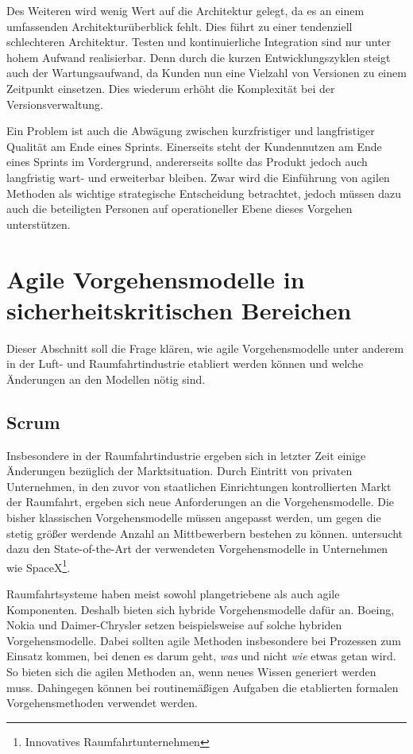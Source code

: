 Des Weiteren wird wenig Wert auf die Architektur gelegt, da es an einem umfassenden Architekturüberblick fehlt. 
Dies führt zu einer tendenziell schlechteren Architektur.
Testen und kontinuierliche Integration sind nur unter hohem Aufwand realisierbar.
Denn durch die kurzen Entwicklungszyklen steigt auch der Wartungsaufwand, da Kunden nun eine Vielzahl von Versionen zu einem Zeitpunkt einsetzen.
Dies wiederum erhöht die Komplexität bei der Versionsverwaltung.
\parencite[Vgl.][S. 1486]{Petersen20091479}

Ein Problem ist auch die Abwägung zwischen kurzfristiger und langfristiger Qualität am Ende eines Sprints.
Einerseits steht der Kundennutzen am Ende eines Sprints im Vordergrund, andererseits sollte das Produkt jedoch auch langfristig wart- und erweiterbar bleiben.
Zwar wird die Einführung von agilen Methoden als wichtige strategische Entscheidung betrachtet, jedoch müssen dazu auch die beteiligten Personen auf operationeller Ebene dieses Vorgehen unterstützen.
\parencite[Vgl.][S. 863 f.]{Moe:2012aa}


\newpage
\section{Agile Vorgehensmodelle in sicherheitskritischen Bereichen} %

Dieser Abschnitt soll die Frage klären, wie agile Vorgehensmodelle unter anderem in der Luft- und Raumfahrtindustrie etabliert werden können und welche Änderungen an den Modellen nötig sind.

\subsection{Scrum} 

Insbesondere in der Raumfahrtindustrie ergeben sich in letzter Zeit einige Änderungen bezüglich der Marktsituation.
Durch Eintritt von privaten Unternehmen, in den zuvor von staatlichen Einrichtungen kontrollierten Markt der Raumfahrt, ergeben sich neue Anforderungen an die Vorgehensmodelle.
Die bisher klassischen Vorgehensmodelle müssen angepasst werden, um gegen die stetig größer werdende Anzahl an Mittbewerbern bestehen zu können.
\parencite[][]{Carpenter:2014aa} untersucht dazu den State-of-the-Art der verwendeten Vorgehensmodelle in Unternehmen wie SpaceX\footnote{Innovatives Raumfahrtunternehmen}.

Raumfahrtsysteme haben meist sowohl plangetriebene als auch agile Komponenten.
Deshalb bieten sich hybride Vorgehensmodelle dafür an.
Boeing, Nokia und Daimer-Chrysler setzen beispielsweise auf solche hybriden  Vorgehensmodelle.
Dabei sollten agile Methoden insbesondere bei Prozessen zum Einsatz kommen, bei denen es darum geht, \emph{was} und nicht \emph{wie} etwas getan wird.
So bieten sich die agilen Methoden an, wenn neues Wissen generiert werden muss. 
Dahingegen können bei routinemäßigen Aufgaben die etablierten formalen Vorgehensmethoden verwendet werden.
\parencite[Vgl.][S. 43]{Carpenter:2014aa}

